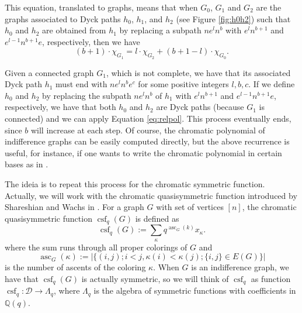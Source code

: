 \documentclass[10pt]{amsart}
\theoremstyle{definition}
\newcommand{\col}{\colon}
\newcommand{\D}{\mathcal{D}}
\DeclareMathOperator{\csf}{csf}
\DeclareMathOperator{\asc}{asc}
\begin{document}
   This equation, translated to graphs, means that when $G_0$, $G_1$ and $G_2$ are the graphs associated to Dyck paths $h_0$, $h_1$, and $h_2$ (see Figure \ref{fig:h0h2}) such that $h_0$ and $h_2$ are obtained from $h_1$ by replacing a subpath  $ne^ln^b$ with $e^ln^{b+1}$ and $e^{l-1}n^{b+1}e$, respectively, then we have
   \begin{equation}
       \label{eq:relpol}
       (b+1)\cdot \chi_{G_1}=l\cdot\chi_{G_2}+(b+1-l)\cdot\chi_{G_0}.
   \end{equation}

   Given a connected graph $G_1$, which is not complete,  we have that its associated Dyck path $h_1$ must end with $ne^ln^be^c$ for some positive integers $l,b,c$. If we define $h_0$ and $h_2$ by replacing the subpath $ne^ln^b$ of $h_1$ with $e^ln^{b+1}$ and $e^{l-1}n^{b+1}e$, respectively, we have that both $h_0$ and $h_2$ are Dyck paths (because $G_1$ is connected) and we can apply Equation \eqref{eq:relpol}. This process eventually ends, since $b$ will increase at each step.  Of course, the chromatic polynomial of indifference graphs can be easily computed directly, but the above recurrence is useful, for instance, if one wants to write the chromatic polynomial in certain bases as in \cite{Brenti}.\par

    The ideia is to repeat this process for the chromatic symmetric function.  Actually, we will work with the chromatic quasisymmetric function introduced by Shareshian and Wachs in \cite{ShareshianWachs}. For a graph $G$ with set of vertices $[n]$, the chromatic quasisymmetric function $\csf_q(G)$ is defined as
    \[
    \csf_q(G):=\sum_{\kappa}q^{\asc_G(k)} x_\kappa.
    \]
    where the sum runs through all proper colorings of $G$  and
    \[
    \asc_G(\kappa):=|\{(i,j);i<j, \kappa(i)<\kappa(j); \{i,j\}\in E(G)\}|
    \]
    is the number of ascents of the coloring $\kappa$.  When $G$ is an indifference graph, we have that $\csf_q(G)$ is actually symmetric, so we will think of $\csf_q$ as function $\csf_q\col \D\to \Lambda_q$, where $\Lambda_q$ is the algebra of symmetric functions with coefficients in $\mathbb{Q}(q)$. \par
\end{document}
